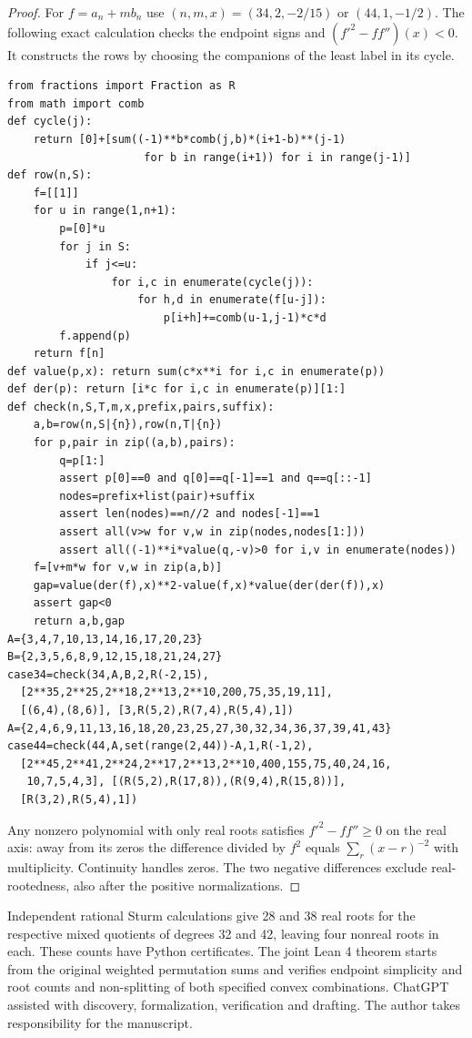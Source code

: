 \documentclass[11pt]{article}
\begin{document}
\begin{proof}
For $f=a_n+m b_n$ use $(n,m,x)=(34,2,-2/15)$ or $(44,1,-1/2)$. The following exact calculation checks the endpoint signs and $(f'^2-ff'')(x)<0$. It constructs the rows by choosing the companions of the least label in its cycle.
{\small
\begin{verbatim}
from fractions import Fraction as R
from math import comb
def cycle(j):
    return [0]+[sum((-1)**b*comb(j,b)*(i+1-b)**(j-1)
                     for b in range(i+1)) for i in range(j-1)]
def row(n,S):
    f=[[1]]
    for u in range(1,n+1):
        p=[0]*u
        for j in S:
            if j<=u:
                for i,c in enumerate(cycle(j)):
                    for h,d in enumerate(f[u-j]):
                        p[i+h]+=comb(u-1,j-1)*c*d
        f.append(p)
    return f[n]
def value(p,x): return sum(c*x**i for i,c in enumerate(p))
def der(p): return [i*c for i,c in enumerate(p)][1:]
def check(n,S,T,m,x,prefix,pairs,suffix):
    a,b=row(n,S|{n}),row(n,T|{n})
    for p,pair in zip((a,b),pairs):
        q=p[1:]
        assert p[0]==0 and q[0]==q[-1]==1 and q==q[::-1]
        nodes=prefix+list(pair)+suffix
        assert len(nodes)==n//2 and nodes[-1]==1
        assert all(v>w for v,w in zip(nodes,nodes[1:]))
        assert all((-1)**i*value(q,-v)>0 for i,v in enumerate(nodes))
    f=[v+m*w for v,w in zip(a,b)]
    gap=value(der(f),x)**2-value(f,x)*value(der(der(f)),x)
    assert gap<0
    return a,b,gap
A={3,4,7,10,13,14,16,17,20,23}
B={2,3,5,6,8,9,12,15,18,21,24,27}
case34=check(34,A,B,2,R(-2,15),
  [2**35,2**25,2**18,2**13,2**10,200,75,35,19,11],
  [(6,4),(8,6)], [3,R(5,2),R(7,4),R(5,4),1])
A={2,4,6,9,11,13,16,18,20,23,25,27,30,32,34,36,37,39,41,43}
case44=check(44,A,set(range(2,44))-A,1,R(-1,2),
  [2**45,2**41,2**24,2**17,2**13,2**10,400,155,75,40,24,16,
   10,7,5,4,3], [(R(5,2),R(17,8)),(R(9,4),R(15,8))],
  [R(3,2),R(5,4),1])
\end{verbatim}
}
Any nonzero polynomial with only real roots satisfies $f'^2-ff''\ge0$ on the real axis: away from its zeros the difference divided by $f^2$ equals $\sum_r (x-r)^{-2}$ with multiplicity. Continuity handles zeros. The two negative differences exclude real-rootedness, also after the positive normalizations.
\end{proof}

Independent rational Sturm calculations give 28 and 38 real roots for the respective mixed quotients of degrees 32 and 42, leaving four nonreal roots in each. These counts have Python certificates. The joint Lean 4 theorem starts from the original weighted permutation sums and verifies endpoint simplicity and root counts and non-splitting of both specified convex combinations. ChatGPT assisted with discovery, formalization, verification and drafting. The author takes responsibility for the manuscript.
\end{document}

